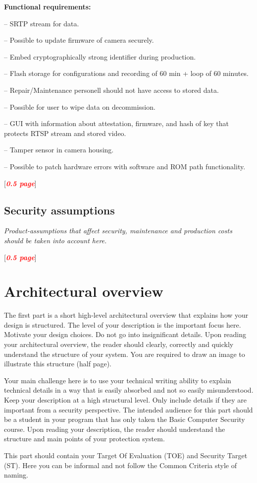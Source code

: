 \documentclass[10pt]{article}
\newcommand{\comm}[1]{{\itshape{{\leavevmode\color{gray}#1}}}}
\newcommand{\todo}[1]{
  \begin{center}
    [\textcolor{red}{\textbf{\textit{#1}}}]
  \end{center}
}
\newenvironment{checklist}{%
  \begin{list}{}{}%
  \let\olditem\item
  \renewcommand\item{\olditem -- \marginpar{$\Box$} }
  \newcommand\checkeditem{\olditem -- \marginpar{$\CheckedBox$} }
}{%
  \end{list}
}
\begin{document}
    \textbf{Functional requirements:}
    \begin{checklist}
      \item{SRTP stream for data.}
      \item{Possible to update firmware of camera securely.}
      \item{Embed cryptographically strong identifier during production.}
      \item{Flash storage for configurations and recording of 60 min + loop of 60 minutes.}
      \item{Repair/Maintenance personell should not have access to stored data.}
      \item{Possible for user to wipe data on decommission.}
      \item{GUI with information about attestation, firmware, and hash of key
        that protects RTSP stream and stored video.}
      \item{Tamper sensor in camera housing.}
      \item{Possible to patch hardware errors with software and ROM path
        functionality.}
    \end{checklist}

    \todo{0.5 page}

    \subsection{Security assumptions}

      \comm{Product-assumptions that affect security, maintenance and production
      costs should be taken into account here.}

      \todo{0.5 page}


  \section{Architectural overview}

    \comm{%
      The first part is a short high-level architectural overview that explains
      how your design is structured.  The level of your description is the
      important focus here. Motivate your design choices. Do not go into
      insignificant details. Upon reading your architectural overview, the
      reader should clearly, correctly and quickly understand the structure of
      your system. You are required to draw an image to illustrate this
      structure (half page).

      Your main challenge here is to use your technical writing ability to
      explain technical details in a way that is easily absorbed and not so
      easily misunderstood. Keep your description at a high structural level.
      Only include details if they are important from a security perspective.
      The intended audience for this part should be a student in your program
      that has only taken the Basic Computer Security course. Upon reading your
      description, the reader should understand the structure and main points
      of your protection system.

      This part should contain your Target Of Evaluation (TOE) and Security
      Target (ST). Here you can be informal and not follow the Common Criteria
      style of naming.
    }
\end{document}
